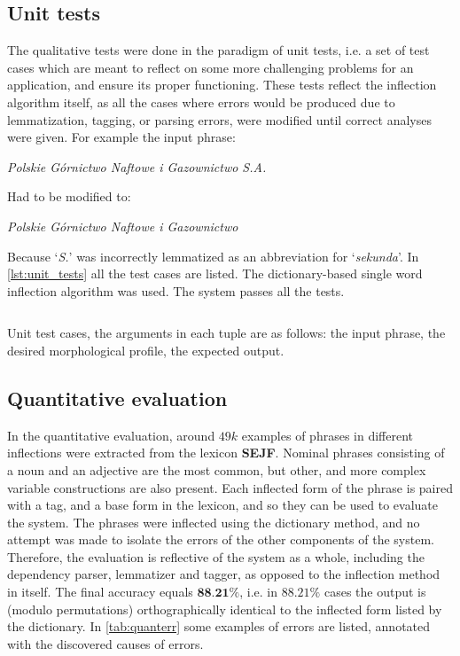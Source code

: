 \documentclass[12pt]{article}
\newcommand{\gloss}[1]{\vspace{10pt}\indent\textit{#1}\vspace{5pt}}
\newcommand{\inlinegloss}[1]{`\textit{#1}'}
\begin{document}
\subsection{Unit tests}
The qualitative tests were done in the paradigm of unit tests, i.e. a set of test cases which are meant to reflect on some more challenging problems for an application, and ensure its proper functioning. These tests reflect the inflection algorithm itself, as all the cases where errors would be produced due to lemmatization, tagging, or parsing errors, were modified until correct analyses were given. For example the input phrase:

\gloss{Polskie Górnictwo Naftowe i Gazownictwo S.A.}

\noindent Had to be modified to:

\gloss{Polskie Górnictwo Naftowe i Gazownictwo}

\noindent Because \inlinegloss{S.} was incorrectly lemmatized as an abbreviation for \inlinegloss{sekunda}. In \autoref{lst:unit_tests} all the test cases are listed. The dictionary-based single word inflection algorithm was used. The system passes all the tests.


\begin{listing}[htbp]
\tiny
\inputminted[linenos,tabsize=2,breaklines]{Python}{tests_snippet.py}
\vspace{-15pt}
\caption{Unit test cases, the arguments in each tuple are as follows: the input phrase, the desired morphological profile, the expected output.}
\label{lst:unit_tests}
\end{listing}

\subsection{Quantitative evaluation}
In the quantitative evaluation, around $49 k$ examples of phrases in different inflections were extracted from the lexicon \textbf{SEJF}\cite{cze:sav:18}. Nominal phrases consisting of a noun and an adjective are the most common, but other, and more complex variable constructions are also present. Each inflected form of the phrase is paired with a tag, and a base form in the lexicon, and so they can be used to evaluate the system. The phrases were inflected using the dictionary method, and no attempt was made to isolate the errors of the other components of the system. Therefore, the evaluation is reflective of the system as a whole, including the dependency parser, lemmatizer and tagger, as opposed to the inflection method in itself. The final accuracy equals $\textbf{88.21\%}$, i.e. in $88.21\%$ cases the output is (modulo permutations) orthographically identical to the inflected form listed by the dictionary. In \autoref{tab:quanterr} some examples of errors are listed, annotated with the discovered causes of errors.
\end{document}
